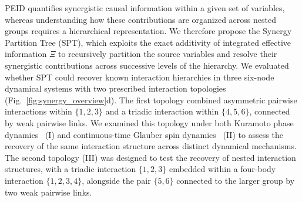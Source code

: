\documentclass[fleqn,10pt]{wlscirep}
\theoremstyle{naturetheorem}
\begin{document}
PEID quantifies synergistic causal information within a given set of variables, whereas understanding how these contributions are organized across nested groups requires a hierarchical representation. We therefore propose the Synergy Partition Tree (SPT), which exploits the exact additivity of integrated effective information $\Xi$ to recursively partition the source variables and resolve their synergistic contributions across successive levels of the hierarchy. We evaluated whether SPT could recover known interaction hierarchies in three six-node dynamical systems with two prescribed interaction topologies (Fig.~\ref{fig:synergy_overview}d). The first topology combined asymmetric pairwise interactions within $\{1,2,3\}$ and a triadic interaction within $\{4,5,6\}$, connected by weak pairwise links. We examined this topology under both Kuramoto phase dynamics~\cite{Kuramoto1984Chemical,Lucas2020Multiorder,Tang2022Optimizing} (I) and continuous-time Glauber spin dynamics~\cite{Glauber1963TimeDependent} (II) to assess the recovery of the same interaction structure across distinct dynamical mechanisms. The second topology (III) was designed to test the recovery of nested interaction structures, with a triadic interaction $\{1,2,3\}$ embedded within a four-body interaction $\{1,2,3,4\}$, alongside the pair $\{5,6\}$ connected to the larger group by two weak pairwise links.

\end{document}
